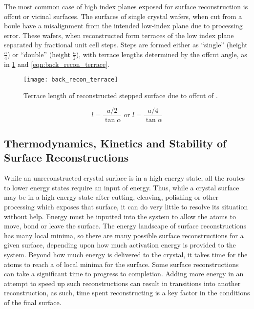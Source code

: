 The most common case of high index planes exposed for surface reconstruction is offcut or vicinal surfaces.
The surfaces of single crystal wafers, when cut from a boule have a misalignment from the intended low-index plane due to processing error.
These wafers, when reconstructed form terraces of the low index plane separated by fractional unit cell steps.
Steps are formed either as ``single'' (height \(\frac{a}{4}\)) or ``double'' (height \(\frac{a}{2}\)), with terrace lengths determined by the offcut angle, as in \cref{fig:back_recon_terrace} and \cref{eqn:back_recon_terrace}.
\begin{figure}
 \centering \texttt{[image: back\_recon\_terrace]}
 \caption{\label{fig:back_recon_terrace}Terrace length of reconstructed stepped surface due to offcut of \textalpha.}
\end{figure}
\begin{equation}
 l = \frac{a/2}{\tan{\alpha}} \text{ or } l = \frac{a/4}{\tan{\alpha}} \label{eqn:back_recon_terrace}
\end{equation}

\subsection{Thermodynamics, Kinetics and Stability of Surface Reconstructions} While an unreconstructed crystal surface is in a high energy state, all the routes to lower energy states require an input of energy.
Thus, while a crystal surface may be in a high energy state after cutting, cleaving, polishing or other processing which exposes that surface, it can do very little to resolve its situation without help.
Energy must be inputted into the system to allow the atoms to move, bond or leave the surface.
The energy landscape of surface reconstructions has many local minima, so there are many possible surface reconstructions for a given surface, depending upon how much activation energy is provided to the system.
Beyond how much energy is delivered to the crystal, it takes time for the atoms to reach a of local minima for the surface.
Some surface reconstructions can take a significant time to progress to completion.
Adding more energy in an attempt to speed up such reconstructions can result in transitions into another reconstruction, as such, time spent reconstructing is a key factor in the conditions of the final surface.

